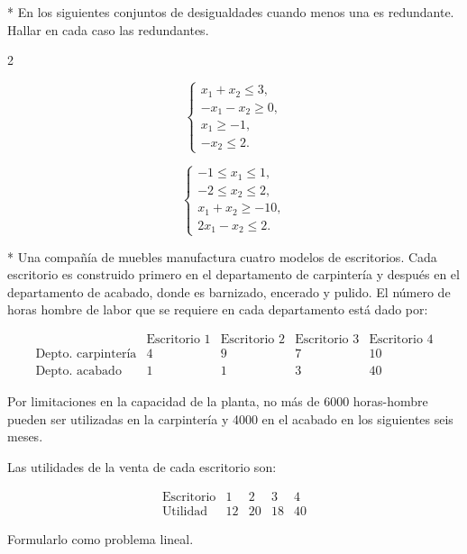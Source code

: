 \begin{Quest}*\label{Pregunta13}
En los siguientes conjuntos de desigualdades cuando menos una es redundante. Hallar en cada caso las redundantes.

\begin{itemize}
\begin{multicols}{2}
\item[a) ]
\[
\begin{cases}
x_1 + x_2 \leq 3, \\
- x_1 - x_2 \geq 0, \\
x_1 \geq -1, \\
- x_2 \leq 2.
\end{cases}
\]

\item[b) ]
\[
\begin{cases}
-1 \leq x_1 \leq 1, \\
-2 \leq x_2 \leq 2, \\
x_1 + x_2 \geq -10, \\
2x_1 - x_2 \leq 2.
\end{cases}
\]
\end{multicols}
\end{itemize}
\end{Quest}


\begin{Quest}*\label{Pregunta14}
Una compa\~n\'ia de muebles manufactura cuatro modelos de escritorios. Cada escritorio es construido primero en el departamento de carpinter\'ia y despu\'es en el departamento de acabado, donde es barnizado, encerado y pulido. El n\'umero de horas hombre de labor que se requiere en cada departamento est\'a dado por:

\[
\begin{array}{c|cccc}
 & \text{Escritorio 1} & \text{Escritorio 2} & \text{Escritorio 3} & \text{Escritorio 4} \\
\hline
\text{Depto. carpinter\'ia} & 4 & 9 & 7 & 10 \\
\text{Depto. acabado} & 1 & 1 & 3 & 40
\end{array}
\]

Por limitaciones en la capacidad de la planta, no m\'as de 6000 horas-hombre pueden ser utilizadas en la carpinter\'ia y 4000 en el acabado en los siguientes seis meses.

Las utilidades de la venta de cada escritorio son:

\[
\begin{array}{c|cccc}
\text{Escritorio} & 1 & 2 & 3 & 4 \\
\hline
\text{Utilidad} & 12 & 20 & 18 & 40
\end{array}
\]

Formularlo como problema lineal.

\end{Quest}


